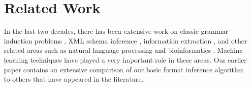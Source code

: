 \section{Related Work}\label{sec:related}

In the last two decades, there has been extensive work on 
classic grammar induction problems
\cite{vidal:gisurvey,gold:inference,bex+:dtd-inference,angluin:revesible-language-inference,Chen95bayesiangrammar},
XML schema inference \cite{bex+:dtd-inference,garofalakis+:xtract}, 
information extraction \cite{kushmerick-phd1997,hong:thesis,arasu+:sigmod03},
and other related areas such as natural language processing 
\cite{borkar+:text-segmentation,Heeman99:speech} and bioinformatics 
\cite{kulp96generalized}. Machine learning techniques have played a
very important role in these areas. 
Our earlier paper \cite{fisher+:dirttoshovels}
contains an extensive comparison of our basic format inference
algorithm to others that have appeared in the literature.

%
%
%
%

